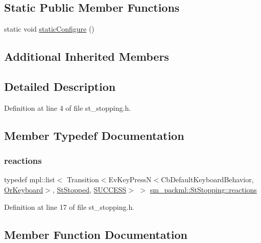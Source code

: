 \subsection*{Static Public Member Functions}
\begin{DoxyCompactItemize}
\item 
static void \hyperlink{structsm__packml_1_1StStopping_aad0f6b6783a0f883b8fc71c01bfb4ab1}{static\+Configure} ()
\end{DoxyCompactItemize}
\subsection*{Additional Inherited Members}


\subsection{Detailed Description}


Definition at line 4 of file st\+\_\+stopping.\+h.



\subsection{Member Typedef Documentation}
\mbox{\label{structsm__packml_1_1StStopping_a436a5a5334e71657c558b693f90c7029}} 
\subsubsection{\texorpdfstring{reactions}{reactions}}
{\footnotesize\ttfamily typedef mpl\+::list$<$ Transition$<$Ev\+Key\+PressN$<$Cb\+Default\+Keyboard\+Behavior, \hyperlink{classsm__packml_1_1OrKeyboard}{Or\+Keyboard}$>$, \hyperlink{structsm__packml_1_1StStopped}{St\+Stopped}, \hyperlink{classSUCCESS}{S\+U\+C\+C\+E\+SS}$>$ $>$ \hyperlink{structsm__packml_1_1StStopping_a436a5a5334e71657c558b693f90c7029}{sm\+\_\+packml\+::\+St\+Stopping\+::reactions}}



Definition at line 17 of file st\+\_\+stopping.\+h.



\subsection{Member Function Documentation}
\mbox{\label{structsm__packml_1_1StStopping_a0f8c7c3109b51da19a58774e6d36fdb5}} 
